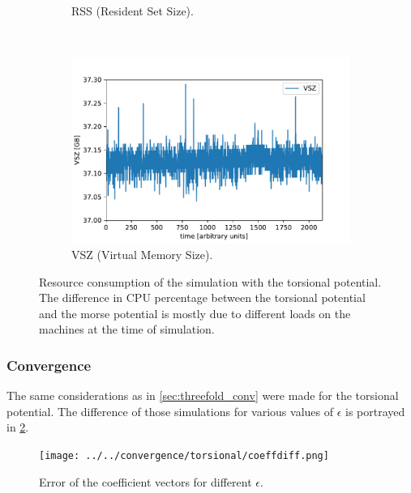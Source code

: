 \documentclass[11pt, a4paper, oneside]{article}
\begin{document}
\begin{figure}[h]
\begin{subfigure}[b]{0.45 \textwidth}
    \caption{RSS (Resident Set Size).}
  \end{subfigure}
  ~
  \begin{subfigure}[b]{0.45 \textwidth}
    \includegraphics[width = \textwidth]{../parser/cospot_VSZ.pdf}
    \caption{VSZ (Virtual Memory Size).}
  \end{subfigure}
  \caption{Resource consumption of the simulation with the torsional potential. The difference in CPU percentage between the torsional potential and the morse potential is mostly due to different loads on the machines at the time of simulation.}
  \label{fig:cos_resource}
\end{figure}


\subsubsection{Convergence}
The same considerations as in \cref{sec:threefold_conv} were made for the torsional potential. The difference of those simulations for various values of $\epsilon$ is portrayed in \cref{fig:convtorsional}.
\begin{figure}[H]
  \centering
  \texttt{[image: ../../convergence/torsional/coeffdiff.png]}
  \caption{Error of the coefficient vectors for different $\epsilon$.}
  \label{fig:convtorsional}
\end{figure}
\end{document}
